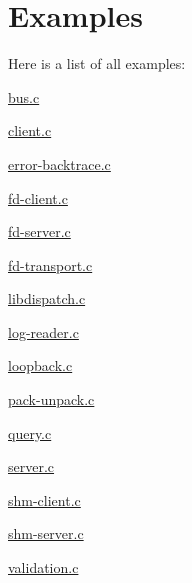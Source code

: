 \section{Examples}
Here is a list of all examples\+:\begin{DoxyCompactItemize}
\item 
\hyperlink{bus_8c-example}{bus.\+c}
\item 
\hyperlink{client_8c-example}{client.\+c}
\item 
\hyperlink{error-backtrace_8c-example}{error-\/backtrace.\+c}
\item 
\hyperlink{fd-client_8c-example}{fd-\/client.\+c}
\item 
\hyperlink{fd-server_8c-example}{fd-\/server.\+c}
\item 
\hyperlink{fd-transport_8c-example}{fd-\/transport.\+c}
\item 
\hyperlink{libdispatch_8c-example}{libdispatch.\+c}
\item 
\hyperlink{log-reader_8c-example}{log-\/reader.\+c}
\item 
\hyperlink{loopback_8c-example}{loopback.\+c}
\item 
\hyperlink{pack-unpack_8c-example}{pack-\/unpack.\+c}
\item 
\hyperlink{query_8c-example}{query.\+c}
\item 
\hyperlink{server_8c-example}{server.\+c}
\item 
\hyperlink{shm-client_8c-example}{shm-\/client.\+c}
\item 
\hyperlink{shm-server_8c-example}{shm-\/server.\+c}
\item 
\hyperlink{validation_8c-example}{validation.\+c}
\end{DoxyCompactItemize}
